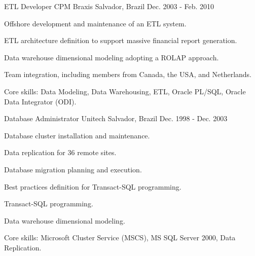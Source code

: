 \begin{cventries}
\cventry
{ETL Developer} %
{CPM Braxis} %
{Salvador, Brazil} %
{Dec. 2003 - Feb. 2010} %
{ %
\begin{cvitems}
\item{Offshore development and maintenance of an ETL system.} 
\item{ETL architecture definition to support massive financial report generation.} 
\item{Data warehouse dimensional modeling adopting a ROLAP approach.}
\item{Team integration, including members from Canada, the USA, and Netherlands.}
\item{Core skills: Data Modeling, Data Warehousing, ETL, Oracle PL/SQL, Oracle Data Integrator (ODI).}
\end{cvitems}
}


\cventry
{Database Administrator} %
{Unitech} %
{Salvador, Brazil} %
{Dec. 1998 - Dec. 2003} %
{ %
\begin{cvitems}
	\item{Database cluster installation and maintenance.}
	\item{Data replication for 36 remote sites.} 
	\item{Database migration planning and execution.}
	\item{Best practices definition for Transact-SQL programming.}
	\item{Transact-SQL programming.}
	\item{Data warehouse dimensional modeling.}
	\item{Core skills: Microsoft Cluster Service (MSCS), MS SQL Server 2000, Data Replication.}
\end{cvitems}
}


\end{cventries}